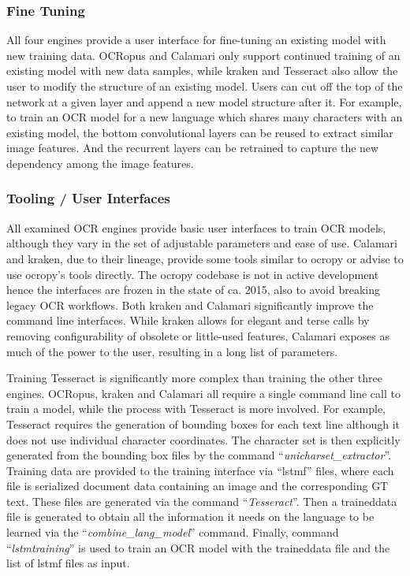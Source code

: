 \documentclass[sigconf]{acmart}
\begin{document}
\subsubsection{Fine Tuning}

All four engines provide a user interface for fine-tuning an
existing model with new training data. OCRopus and Calamari only support
continued training of an existing model with new data samples,
while kraken and Tesseract also allow the user to modify the structure of an existing model. Users can cut off the top of the network at a given layer and append a new model structure after it.
For example, to train an OCR model for a new
language which shares many characters with an existing model,
the bottom convolutional layers can be reused to extract similar image features. And the recurrent layers can be retrained to capture the new dependency among the image features.

\subsubsection{Tooling / User Interfaces}

All examined OCR engines provide basic user interfaces to
train OCR models, although they vary in the set of adjustable
parameters and ease of use. Calamari and kraken, due to their lineage,
provide some tools similar to ocropy or advise to use ocropy's tools
directly. The ocropy codebase is not in active development hence the interfaces
are frozen in the state of ca. 2015, also to avoid breaking legacy OCR
workflows. Both kraken and Calamari significantly improve the command
line interfaces. While kraken allows for elegant and terse calls by
removing configurability of obsolete or little-used features, Calamari
exposes as much of the power to the user, resulting in a long list
of parameters.

Training Tesseract is significantly more complex than training the other three engines. 
OCRopus, kraken and Calamari all require a single command line call to train
a model, while the process with Tesseract is more involved.
For example, Tesseract requires the generation of bounding boxes for each text 
line although it does not use individual character coordinates. 
The character set is then explicitly generated from the bounding box files by the
command ``\textit{unicharset\_extractor}''. Training data are
provided to the training interface via ``lstmf'' files, where each
file is serialized document data containing an image and the
corresponding GT text. These files are generated via the
command ``\textit{Tesseract}''. Then a traineddata file is generated
to obtain all the information it needs on the language to be
learned via the ``\textit{combine\_lang\_model}'' command. Finally,
command ``\textit{lstmtraining}'' is used to train an OCR model with
the traineddata file and the list of lstmf files as input.
\end{document}
